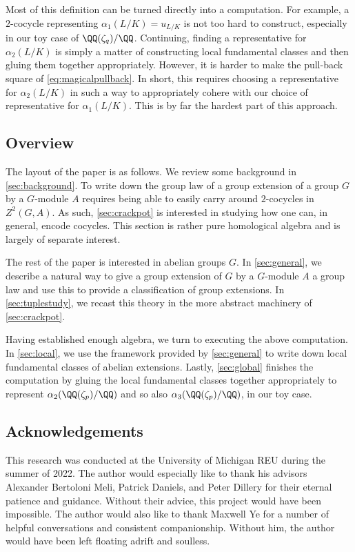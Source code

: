 Most of this definition can be turned directly into a computation. For example, a $2$-cocycle representing $\alpha_1(L/K)=u_{L/K}$ is not too hard to construct, especially in our toy case of $\QQ(\zeta_q)/\QQ$. Continuing, finding a representative for $\alpha_2(L/K)$ is simply a matter of constructing local fundamental classes and then gluing them together appropriately. However, it is harder to make the pull-back square of \autoref{eq:magicalpullback}. In short, this requires choosing a representative for $\alpha_2(L/K)$ in such a way to appropriately cohere with our choice of representative for $\alpha_1(L/K)$. This is by far the hardest part of this approach.

\subsection{Overview}
The layout of the paper is as follows. We review some background in \autoref{sec:background}. To write down the group law of a group extension of a group $G$ by a $G$-module $A$ requires being able to easily carry around $2$-cocycles in $Z^2(G,A)$. As such, \autoref{sec:crackpot} is interested in studying how one can, in general, encode cocycles. This section is rather pure homological algebra and is largely of separate interest.

The rest of the paper is interested in abelian groups $G$. In \autoref{sec:general}, we describe a natural way to give a group extension of $G$ by a $G$-module $A$ a group law and use this to provide a classification of group extensions. In \autoref{sec:tuplestudy}, we recast this theory in the more abstract machinery of \autoref{sec:crackpot}.

Having established enough algebra, we turn to executing the above computation. In \autoref{sec:local}, we use the framework provided by \autoref{sec:general} to write down local fundamental classes of abelian extensions. Lastly, \autoref{sec:global} finishes the computation by gluing the local fundamental classes together appropriately to represent $\alpha_2(\QQ(\zeta_p)/\QQ)$ and so also $\alpha_3(\QQ(\zeta_p)/\QQ)$, in our toy case.

\subsection{Acknowledgements}
This research was conducted at the University of Michigan REU during the summer of 2022. The author would especially like to thank his advisors Alexander Bertoloni Meli, Patrick Daniels, and Peter Dillery for their eternal patience and guidance. Without their advice, this project would have been impossible. The author would also like to thank Maxwell Ye for a number of helpful conversations and consistent companionship. Without him, the author would have been left floating adrift and soulless.